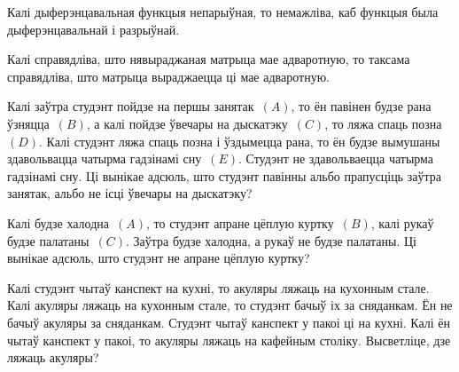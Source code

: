 \begin{problemList}
\begin{belarusianEnumerate}
			\item Калі дыферэнцавальная функцыя непарыўная, то немажліва, каб функцыя была дыферэнцавальнай і разрыўнай. \\
			
			\item Калі справядліва, што нявыраджаная матрыца мае адваротную, то таксама справядліва, што матрыца выраджаецца ці мае адваротную. \\
		\end{belarusianEnumerate}
		
		\bigskip
		
		\item Калі заўтра студэнт пойдзе на першы занятак~$(A)$, то ён павінен будзе рана ўзняцца~$(B)$, а калі пойдзе ўвечары на дыскатэку~$(C)$, то ляжа спаць позна~$(D)$. Калі студэнт ляжа спаць позна і ўздымецца рана, то ён будзе вымушаны здавольвацца чатырма гадзінамі сну~$(E)$. Студэнт не здавольваецца чатырма гадзінамі сну. Ці вынікае адсюль, што студэнт павінны альбо прапусціць заўтра занятак, альбо не ісці ўвечары на дыскатэку? \\
		
		\bigskip
		
		\item Калі будзе халодна~$(A)$, то студэнт апране цёплую куртку~$(B)$, калі рукаў будзе палатаны~$(C)$. Заўтра будзе халодна, а рукаў не будзе палатаны. Ці вынікае адсюль, што студэнт не апране цёплую куртку? \\
		
		\newpage
		
		\item Калі студэнт чытаў канспект на кухні, то акуляры ляжаць на кухонным стале. Калі акуляры ляжаць на кухонным стале, то студэнт бачыў іх за сняданкам. Ён не бачыў акуляры за сняданкам. Студэнт чытаў канспект у пакоі ці на кухні. Калі ён чытаў канспект у пакоі, то акуляры ляжаць на кафейным століку. Высветліце, дзе ляжаць акуляры? \\ 
		

\end{problemList}
